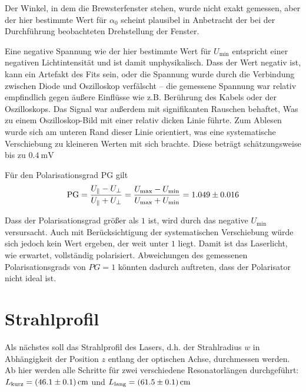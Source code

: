 \documentclass{article}
\newcommand{\mr}{\mathrm}
\begin{document}
Der Winkel, in dem die Brewsterfenster stehen, wurde nicht exakt gemessen,
aber der hier bestimmte Wert für $\alpha_0$ scheint plausibel in Anbetracht der
bei der Durchführung beobachteten Drehstellung der Fenster.

Eine negative Spannung wie der hier bestimmte Wert für $U_\mr{min}$ entspricht einer negativen
Lichtintensität und ist damit unphysikalisch. Dass der Wert negativ ist, kann ein Artefakt des Fits sein,
oder die Spannung wurde durch die Verbindung zwischen Diode und Oszilloskop verfälscht -- die gemessene
Spannung war relativ empfindlich gegen äußere Einflüsse wie z.B. Berührung des Kabels oder der Oszilloskops.
Das Signal war außerdem mit signifikanten Rauschen behaftet, Was zu einem Oszilloskop-Bild mit einer relativ
dicken Linie führte. Zum Ablesen wurde sich am unteren Rand dieser Linie orientiert,
was eine systematische Verschiebung zu kleineren Werten mit sich brachte. Diese beträgt schätzungsweise bis zu $\SI{0.4}{\mV}$


Für den Polarisationsgrad PG \cite[S.237]{demtröder2} gilt 
\begin{equation}
  \mr{PG} = \frac{U_\mr{\parallel} - U_\mr{\perp}}{U_\mr{\parallel} + U_\mr{\perp}} =
  \frac{U_\mr{max} - U_\mr{min}}{U_\mr{max} + U_\mr{min}} = \num{1.049\pm0.016} 
\end{equation}

Dass der Polarisationsgrad größer als $1$ ist, wird durch das negative $U_\mr{min}$ versursacht.
Auch mit Berücksichtigung der systematischen Verschiebung würde sich jedoch kein Wert ergeben,
der weit unter $1$ liegt. Damit ist das Laserlicht, wie erwartet, vollständig polarisiert.
Abweichungen des gemessenen Polarisationsgrads von $PG=1$ könnten dadurch auftreten, dass der Polarisator nicht ideal ist.



\section{Strahlprofil}
Als nächstes soll das Strahlprofil des Lasers, d.h. der Strahlradius $w$ in Abhängigkeit der Position $z$ 
entlang der optischen Achse, durchmessen werden. Ab hier werden alle Schritte für zwei verschiedene Resonatorlängen durchgeführt:
$L_\mr{kurz} = \SI{46.1\pm0.1}{\cm}$ und $L_\mr{lang} = \SI{61.5\pm0.1}{\cm}$
\end{document}

